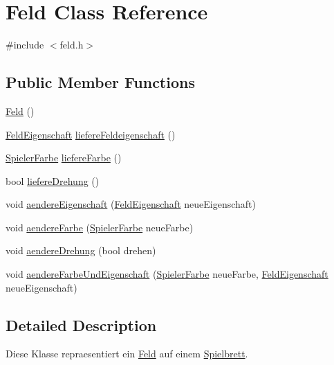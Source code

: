 \hypertarget{classFeld}{\section{Feld Class Reference}
\label{classFeld}
}


{\ttfamily \#include $<$feld.\-h$>$}

\subsection*{Public Member Functions}
\begin{DoxyCompactItemize}
\item 
\hyperlink{classFeld_a8a3098df53c8ae2ef988d0d2e34be1db}{Feld} ()
\item 
\hyperlink{DEFINE_8h_a38d3a135c8443ff29d22fa0756476c5b}{Feld\-Eigenschaft} \hyperlink{classFeld_a99a02b1d81eccc5ced54da45d37eedd1}{liefere\-Feldeigenschaft} ()
\item 
\hyperlink{DEFINE_8h_af7777a498318335ea89b85bdc0d1651f}{Spieler\-Farbe} \hyperlink{classFeld_a71857da4dc18318fc85c3332179db0a0}{liefere\-Farbe} ()
\item 
bool \hyperlink{classFeld_add4df21f3360a4405076f9e78f64c34e}{liefere\-Drehung} ()
\item 
void \hyperlink{classFeld_ae11f5df6990d6153f5c09f6e3f1d60d3}{aendere\-Eigenschaft} (\hyperlink{DEFINE_8h_a38d3a135c8443ff29d22fa0756476c5b}{Feld\-Eigenschaft} neue\-Eigenschaft)
\item 
void \hyperlink{classFeld_a214e1a88b71ffee9fb88c1643ec97525}{aendere\-Farbe} (\hyperlink{DEFINE_8h_af7777a498318335ea89b85bdc0d1651f}{Spieler\-Farbe} neue\-Farbe)
\item 
void \hyperlink{classFeld_a5668abf4e68ad86c820238a06a3ae2fd}{aendere\-Drehung} (bool drehen)
\item 
void \hyperlink{classFeld_a17f0cf8213cc7c98f3e8d73c9ed8bca9}{aendere\-Farbe\-Und\-Eigenschaft} (\hyperlink{DEFINE_8h_af7777a498318335ea89b85bdc0d1651f}{Spieler\-Farbe} neue\-Farbe, \hyperlink{DEFINE_8h_a38d3a135c8443ff29d22fa0756476c5b}{Feld\-Eigenschaft} neue\-Eigenschaft)
\end{DoxyCompactItemize}


\subsection{Detailed Description}
Diese Klasse repraesentiert ein \hyperlink{classFeld}{Feld} auf einem \hyperlink{classSpielbrett}{Spielbrett}. 

